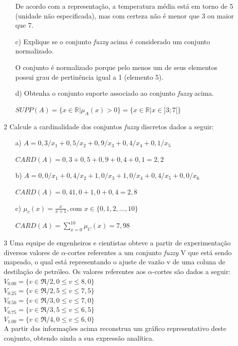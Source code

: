\documentclass{report}
\begin{document}
\begin{enumerate}
\begin{enumerate}
    De acordo com a representação, a temperatura média está em torno de 5 (unidade não especificada), mas com certeza não
    é menor que 3 ou maior que 7. 

    \item[c)] Explique se o conjunto \emph{fuzzy} acima é considerado um conjunto normalizado.

    O conjunto é normalizado porque pelo menos um de seus elementos possui grau de pertinência igual a 1 (elemento 5).


    \item[d)] Obtenha o conjunto suporte associado ao conjunto \emph{fuzzy} acima.

    $SUPP(A) = \{ x \in  \mathbb{R} \vert \mu_A(x) > 0\} = \{ x \in \mathbb{R} \vert x \in ]3;7[ \}$

\end{enumerate}

\item[2] Calcule a cardinalidade dos conjuntos \emph{fuzzy} discretos dados a seguir:
\begin{enumerate}
    \item[a)] $A = 0,3/x_1 + 0,5/x_2 + 0,9/x_3 + 0,4/x_4 + 0,1/x_5$

    $CARD(A) = 0,3+0,5+0,9+0,4+0,1 = 2,2 $

    \item[b)] $A = 0,0/x_1 + 0,4/x_2 + 1,0/x_3 + 1,0/x_4 + 0,4/x_5 + 0,0/x_6$

    $CARD(A) = 0,4 1,0+ 1,0 + 0,4 = 2,8$


    \item[c)] $\mu_c(x)=\frac{x}{x+1}, \text{com } x \in \{0,1,2,...,10 \}$

    $ CARD(A) = \sum\limits_{x=0}^{10}\mu_C(x) = 7,98$ 

\end{enumerate}


\item[3] Uma equipe de engenheiros e cientistas obteve a partir de experimentação diversos valores de
$\alpha$-cortes referentes a um conjunto \emph{fuzzy} V que está sendo mapeado, o qual está representando o
ajuste de vazão v de uma coluna de destilação de petróleo. Os valores referentes aos $\alpha$-cortes são
dados a seguir:\\
$V_{0.00} = \{v \in \Re / 2,0 \leq v \leq 8,0\}$\\
$V_{0.25} = \{v \in \Re / 2,5 \leq v \leq 7,5\}$\\
$V_{0.50} = \{v \in \Re / 3,0 \leq v \leq 7,0\}$\\
$V_{0.75} = \{v \in \Re / 3,5 \leq v \leq 6,5\}$\\
$V_{1.00} = \{v \in \Re / 4,0 \leq v \leq 6,0\}$\\
A partir das informações acima reconstrua um gráfico representativo deste conjunto, obtendo
ainda a sua expressão analítica.


\end{enumerate}
\end{document}
